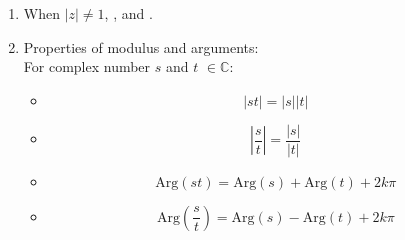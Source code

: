 \documentclass[12pt, a4paper]{article}
\newtheorem{proof}{Proof}[subsection]
\def\C{{\mathbb{C}}}
\def\i{{\mathrm{i}}}
\def\Arg{{\mathrm{Arg}}}
\begin{document}
\begin{enumerate}
\begin{proof}
\begin{multicols}{2}
    \begin{boxed}{}\end{boxed}
    $$\begin{aligned}
      \text{RHS}=z^{-1}&=\frac{1}{a+b\i}=\frac{a-b\i}{(a+b\i)(a-b\i)}\\
      &=\frac{a-b\i}{a^2+b^2}=a-b\i\\
      &=z^*=\text{LHS}.
    \end{aligned}$$
    \begin{boxed}{}\end{boxed}
    $$\begin{aligned}
      z\cdot z^*&=(a+b\i)(a-b\i)\\
      &=a^2+b^2\\
      &=|z|^2=1\\
      \therefore \ &\ z^*=z^{-1}
    \end{aligned}$$
    \end{multicols}
  \end{proof}
  \item When $|z|\neq 1$, {}, and {}.
  \item Properties of modulus and arguments: \\
  For complex number $s$ and $t$ $\in\C$: 
  \begin{itemize}
    \item $$|st|=|s||t|$$
    \item $$\left|\frac{s}{t}\right|=\frac{|s|}{|t|}$$
    \item $$\Arg(st)=\Arg(s)+\Arg(t)+2k\pi$$
    \item $$\Arg\left(\frac{s}{t}\right)=\Arg(s)-\Arg(t)+2k\pi$$
  \end{itemize}
\end{enumerate}
\end{document}
